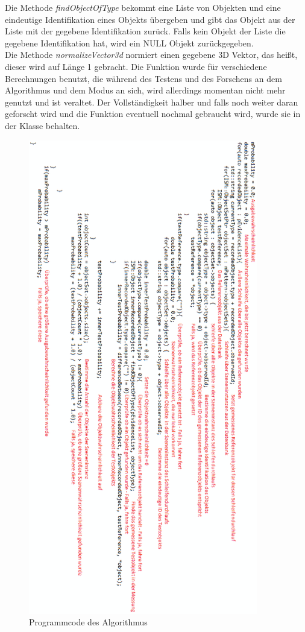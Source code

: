 Die Methode \textit{findObjectOfType} bekommt eine Liste von Objekten und eine eindeutige Identifikation eines Objekts übergeben und gibt das Objekt aus der Liste mit der gegebene Identifikation zurück. Falls kein Objekt der Liste die gegebene Identifikation hat, wird ein NULL Objekt zurückgegeben.\smallskip\\
Die Methode \textit{normalizeVector3d} normiert einen gegebene 3D Vektor, das heißt, dieser wird auf Länge 1 gebracht. Die Funktion wurde für verschiedene Berechnungen benutzt, die während des Testens und des Forschens an dem Algorithmus und dem Modus an sich, wird allerdings momentan nicht mehr genutzt und ist veraltet. Der Vollständigkeit halber und falls noch weiter daran geforscht wird und die Funktion eventuell nochmal gebraucht wird, wurde sie in der Klasse behalten.\smallskip\\
\begin{figure}
	\centering
	\includegraphics[width=10cm]{bilder/ProgrammcodeKommentiert.pdf}
	\caption{Programmcode des Algorithmus}
	\label{img:programcode}
\end{figure}

